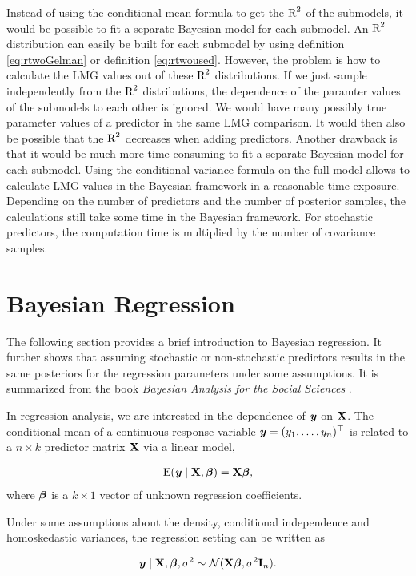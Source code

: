 \documentclass[11pt,a4paper,twoside]{book}
\begin{document}
Instead of using the conditional mean formula to get the $\text{R}^2$ of the submodels,  it would be possible to fit a separate Bayesian model for each submodel. An $\text{R}^2$ distribution can easily be built for each submodel by using definition \eqref{eq:rtwoGelman} or definition \eqref{eq:rtwoused}. However, the problem is how to calculate the LMG values out of these $\text{R}^2$ distributions. If we just sample independently from the $\text{R}^2$ distributions, the dependence of the paramter values of the submodels to each other is ignored. We would have many possibly true parameter values of a predictor in the same LMG comparison. It would then also be possible that the $\text{R}^2$ decreases when adding predictors.  Another drawback is that it would be much more time-consuming to fit a separate Bayesian model for each submodel. Using the conditional variance formula on the full-model allows to calculate LMG values in the Bayesian framework in a reasonable time exposure. Depending on the number of predictors and the number of posterior samples, the calculations still take some time in the Bayesian framework. For stochastic predictors, the computation time is multiplied by the number of covariance samples.


\section{Bayesian Regression}
The following section provides a brief introduction to Bayesian regression. It further shows that assuming stochastic or non-stochastic predictors results in the same posteriors for the regression parameters under some assumptions.  It is summarized from the book \textit{Bayesian Analysis for the Social Sciences} \citep{Jackman2009}. 

In regression analysis, we are interested in the dependence of ${\textbf{\textit{y}}}$ on ${\mathbf{X}}$. The conditional mean of a continuous response variable ${\textbf{\textit{y}}} = (y_{1}, \dots, y_{n})^\top$ is related to a $n \times k$ predictor matrix ${\mathbf{X}}$ via a linear model, 

       \begin{align*} 
\operatorname{E}({\textbf{\textit{y}}} \mid {\mathbf{X}} , {\boldsymbol{\beta}}) = {\mathbf{X}} {\boldsymbol{\beta}} ,
   \end{align*}
where ${\boldsymbol{\beta}}$ is a $k \times 1$ vector of unknown regression coefficients.

Under some assumptions about the density, conditional independence and homoskedastic variances, the regression setting can be written as

       \begin{align*} 
{\textbf{\textit{y}}} \mid {\mathbf{X}} , {\boldsymbol{\beta}}, \sigma^2 \sim \mathcal{N}({\mathbf{X}} {\boldsymbol{\beta}} , \sigma^2 {\mathbf{I}}_{n}) \text{.}
   \end{align*}
\end{document}
